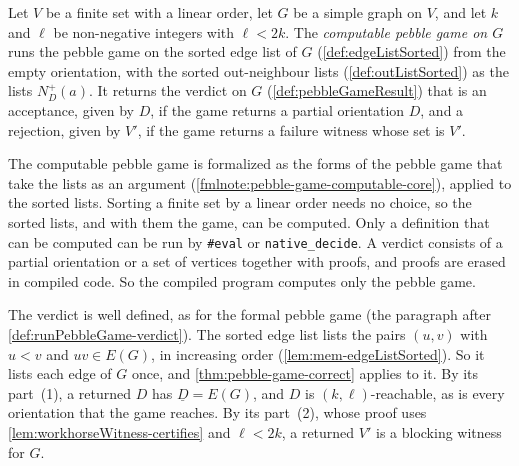 \begin{definition}
  \label{def:runPebbleGameExec}
  \leanok
  Let $V$ be a finite set with a linear order, let $G$ be a simple graph
  on $V$, and let $k$ and $\ell$ be non-negative integers with
  $\ell < 2k$. The \emph{computable pebble game on $G$} runs the pebble
  game on the sorted edge list of $G$ (\cref{def:edgeListSorted}) from
  the empty orientation, with the sorted out-neighbour lists
  (\cref{def:outListSorted}) as the lists $N^+_D(a)$. It returns the
  verdict on $G$ (\cref{def:pebbleGameResult}) that is an acceptance,
  given by $D$, if the game returns a partial orientation $D$, and a
  rejection, given by $V'$, if the game returns a failure witness whose
  set is $V'$.
\end{definition}

\begin{fmlnote}
  \label{fmlnote:executable-computable-core}
  The computable pebble game is formalized as the forms of the pebble
  game that take the lists as an argument
  (\cref{fmlnote:pebble-game-computable-core}), applied to the sorted
  lists. Sorting a finite set by a linear order needs no choice, so the
  sorted lists, and with them the game, can be computed. Only a
  definition that can be computed can be run by \texttt{\#eval} or
  \texttt{native\_decide}. A verdict consists of a partial orientation
  or a set of vertices together with proofs, and proofs are erased in
  compiled code. So the compiled program computes only the pebble game.
\end{fmlnote}

The verdict is well defined, as for the formal pebble game (the
paragraph after \cref{def:runPebbleGame-verdict}). The sorted edge list
lists the pairs $(u, v)$ with $u < v$ and $uv \in E(G)$, in increasing
order (\cref{lem:mem-edgeListSorted}). So it lists each edge of $G$
once, and \cref{thm:pebble-game-correct} applies to it. By its
part~(1), a returned $D$ has $\underline{D} = E(G)$, and $D$ is
$(k, \ell)$-reachable, as is every orientation that the game reaches.
By its part~(2), whose proof uses \cref{lem:workhorseWitness-certifies}
and $\ell < 2k$, a returned $V'$ is a blocking witness for $G$.

